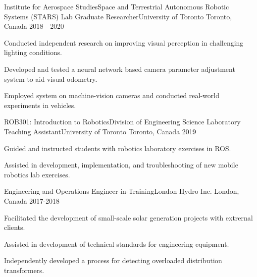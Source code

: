 

\begin{cventries}

  \cventry
    {Institute for Aerospace Studies{\enskip\cdotp\enskip}Space and Terrestrial Autonomous Robotic Systems (STARS) Lab} %
    {Graduate Researcher{\enskip\cdotp\enskip}University of Toronto} %
    {Toronto, Canada} %
    {2018 - 2020} %
    {
      \begin{cvitems} %
        \item {Conducted independent research on improving visual perception in challenging lighting conditions.}
        \item {Developed and tested a neural network based camera parameter adjustment system to aid visual odometry.}
        \item {Employed system on machine-vision cameras and conducted real-world experiments in vehicles.}
      \end{cvitems}
    }
    
  \cventry
    {ROB301: Introduction to Robotics{\enskip\cdotp\enskip}Division of Engineering Science} %
    {Laboratory Teaching Assistant{\enskip\cdotp\enskip}University of Toronto} %
    {Toronto, Canada} %
    {2019} %
    {
      \begin{cvitems} %
        \item {Guided and instructed students with robotics laboratory exercises in ROS.}
        \item {Assisted in development, implementation, and troubleshooting of new mobile robotics lab exercises.}
      \end{cvitems}
    }
    
  \cventry
	{Engineering and Operations} %
	{Engineer-in-Training{\enskip\cdotp\enskip}London Hydro Inc.} %
	{London, Canada} %
	{2017-2018} %
	{
	  \begin{cvitems} %
	  	\item {Facilitated the development of small-scale solar generation projects with extrernal clients.}
        \item {Assisted in development of technical standards for engineering equipment.}
        \item {Independently developed a process for detecting overloaded distribution transformers.}
	  \end{cvitems}
    }

\end{cventries}

